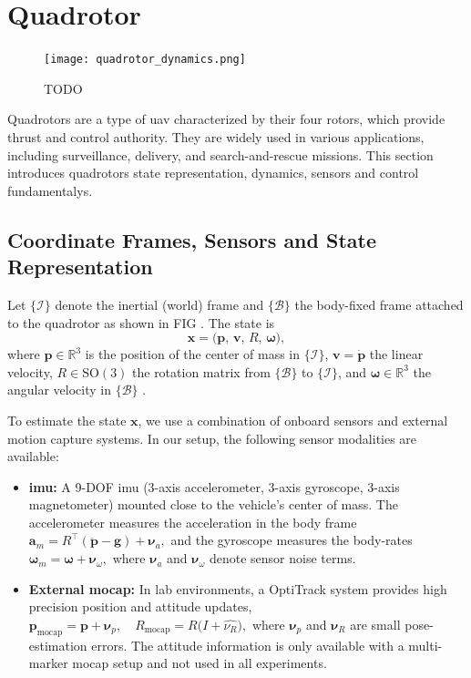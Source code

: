 \section{Quadrotor}
\begin{figure}
\centering
\texttt{[image: quadrotor\_dynamics.png]}
\caption{TODO}
\end{figure}
\label{sec:quadrotor_control}
Quadrotors are a type of \gls{uav} characterized by their four rotors, which provide thrust and control authority. They are widely used in various applications, including surveillance, delivery, and search-and-rescue missions.
This section introduces  quadrotors state representation, dynamics, sensors and control fundamentalys. 

\subsection{Coordinate Frames, Sensors and State Representation}
Let $\{\mathcal I\}$ denote the inertial (world) frame and $\{\mathcal B\}$ the body-fixed frame attached to the quadrotor as shown in FIG . The state is
\[
\bm x = \bigl(\bm p,\,\bm v,\,R,\,\bm \omega\bigr),
\]
where $\bm p\in\mathbb R^3$ is the position of the center of mass in $\{\mathcal I\}$, $\bm v = \dot{\bm p}$ the linear velocity, $R\in \mathrm{SO}(3)$ the rotation matrix from $\{\mathcal B\}$ to $\{\mathcal I\}$, and $\bm\omega\in\mathbb R^3$ the angular velocity in $\{\mathcal B\}$ .

To estimate the state $\bm x$, we use a combination of onboard sensors and external motion capture systems. In our setup, the following sensor modalities are available:

\begin{itemize}
  \item \textbf{\gls{imu}:} A 9-DOF \gls{imu} (3-axis accelerometer, 3-axis gyroscope, 3-axis magnetometer) mounted close to the vehicle's center of mass. The accelerometer measures the acceleration in the body frame
    \(
      \bm a_m = R^\top (\ddot{\bm p} - \bm g) + \bm \nu_a,
    \)
    and the gyroscope measures the body-rates
    \(
      \bm \omega_m = \bm \omega + \bm \nu_\omega,
    \)
    where $\bm \nu_a$ and $\bm \nu_\omega$ denote sensor noise terms.
 
  \item \textbf{External \gls{mocap}:} In lab environments, a OptiTrack system provides high precision position and attitude updates,
    \(
      \bm p_{\text{mocap}} = \bm p + \bm \nu_p,\quad
      R_{\mathrm{mocap}} = R \bigl(I + \widehat{\nu_R}\bigr),
    \)
    where $\bm \nu_p$ and $\bm \nu_R$ are small pose-estimation errors. The attitude information is only available with a multi-marker mocap setup and not used in all experiments.
\end{itemize}

